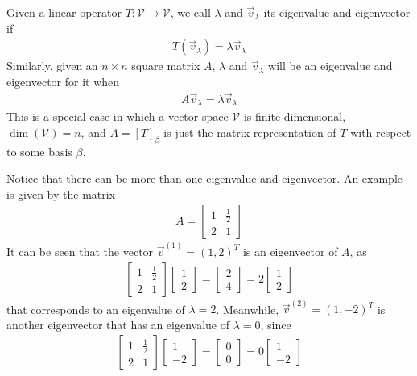 \begin{defn}
\label{defn:eigen}
Given a linear operator $T: \mathcal{V} \to \mathcal{V}$, we call $\lambda$ and $\vec{v}_\lambda$ its eigenvalue and eigenvector if
\begin{align}
T(\vec{v}_\lambda) = \lambda\vec{v}_\lambda
\end{align}
Similarly, given an $n \times n$ square matrix $A$, $\lambda$ and $\vec{v}_\lambda$ will be an eigenvalue and eigenvector for it when
\begin{align}
A\vec{v}_\lambda = \lambda\vec{v}_\lambda \label{eqn:eigenmat}
\end{align}
This is a special case in which a vector space $\mathcal{V}$ is finite-dimensional, $\dim(\mathcal{V}) = n$, and $A = [T]_\beta$ is just the matrix representation of $T$ with respect to some basis $\mathcal{\beta}$.
\end{defn}
Notice that there can be more than one eigenvalue and eigenvector. An example is given by the matrix
\begin{align*}
A =
\begin{bmatrix}
1 & \frac{1}{2} \\
2 & 1
\end{bmatrix}
\end{align*}
It can be seen that the vector $\vec{v}^{(1)} = (1,2)^T$ is an eigenvector of $A$, as
\begin{align*}
\begin{bmatrix}
1 & \frac{1}{2} \\
2 & 1
\end{bmatrix}
\begin{bmatrix}
1 \\
2
\end{bmatrix}
=
\begin{bmatrix}
2 \\
4
\end{bmatrix}
=
2
\begin{bmatrix}
1 \\
2 
\end{bmatrix}
\end{align*}
that corresponds to an eigenvalue of $\lambda = 2$. Meanwhile, $\vec{v}^{(2)} = (1,-2)^T$ is another eigenvector that has an eigenvalue of $\lambda = 0$, since
\begin{align*}
\begin{bmatrix}
1 & \frac{1}{2} \\
2 & 1
\end{bmatrix}
\begin{bmatrix}
1 \\
-2
\end{bmatrix}
=
\begin{bmatrix}
0 \\
0
\end{bmatrix}
=
0
\begin{bmatrix}
1 \\
-2
\end{bmatrix}
\end{align*}
